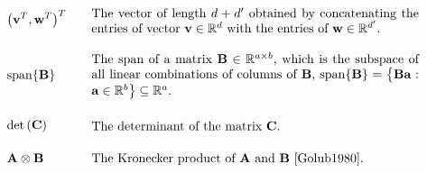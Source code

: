 \newpage
\begin{align} 
	&\big(\vv^{T},\vw^{T} \big)^{T}  & \quad &  \parbox{.75\textwidth}{The vector of length $\featurelen+\featurelen'$ 
		obtained by concatenating the entries of vector $\vv \in \mathbb{R}^{\featurelen}$ with the entries of $\vw \in \mathbb{R}^{\featurelen'}$.} \nonumber \\[4mm]
	&	{\rm span}\{ \mathbf{B} \}  & \quad &  \parbox{.75\textwidth}{The span of a matrix $\mathbf{B} \in \mathbb{R}^{a \times b}$, 
		which is the subspace of all linear combinations of columns of $\mathbf{B}$, 
		${\rm span}\{ \mathbf{B} \} = \big\{  \mathbf{B} \va : \va \in \mathbb{R}^{b} \big\} \subseteq \mathbb{R}^{a}$.} \nonumber \\[4mm]
	&\determinant{\mC} &\quad & \parbox{.75\textwidth}{The determinant of the matrix $\mC$. }  \nonumber  \\[4mm]
	&\mathbf{A} \otimes \mathbf{B} &\quad & \parbox{.75\textwidth}{The Kronecker product of $\mathbf{A}$ and $\mathbf{B}$ \cite{Golub1980}. }  \nonumber
\end{align} 

\newpage
